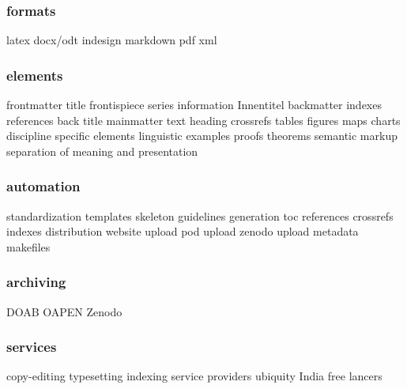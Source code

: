\documentclass[output=guidelines,guidelines] {langscibook}
\begin{document}
\subsubsection{formats}
                    latex
                    docx/odt
                    indesign
                    markdown
                    pdf
                    xml
\subsubsection{elements}
                    frontmatter
                        title
                        frontispiece
                        series information
                        Innentitel
                    backmatter
                        indexes
                        references
                        back title
                    mainmatter
                        text
                        heading
                        crossrefs
                        tables
                        figures
                        maps
                        charts
                        discipline specific elements
                            linguistic examples
                            proofs
                            theorems
                    semantic markup
                        separation of meaning and presentation
\subsubsection{automation}
                    standardization
                        templates
                        skeleton
                        guidelines
                    generation
                        toc
                        references
                        crossrefs
                        indexes
                    distribution
                        website upload
                        pod upload
                        zenodo upload
                    metadata
                    makefiles
\subsubsection{archiving}
                    DOAB
                    OAPEN
                    Zenodo
\subsubsection{services}
                    copy-editing
                    typesetting
                    indexing
                    service providers
                        ubiquity
                        India
                        free lancers
\end{document}
